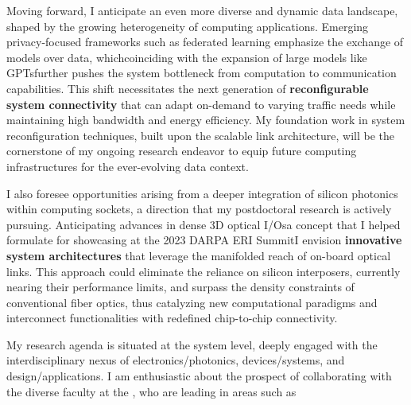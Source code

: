 Moving forward, I anticipate an even more diverse and dynamic data landscape, shaped by the growing heterogeneity of computing applications. Emerging privacy-focused frameworks such as federated learning emphasize the exchange of models over data, which\textemdash coinciding with the expansion of large models like GPTs\textemdash further pushes the system bottleneck from computation to communication capabilities. This shift necessitates the next generation of \textbf{reconfigurable system connectivity} that can adapt on-demand to varying traffic needs while maintaining high bandwidth and energy efficiency. My foundation work in system reconfiguration techniques, built upon the scalable link architecture, will be the cornerstone of my ongoing research endeavor to equip future computing infrastructures for the ever-evolving data context.

I also foresee opportunities arising from a deeper integration of silicon photonics within computing sockets, a direction that my postdoctoral research is actively pursuing. Anticipating advances in dense 3D optical I/Os\textemdash a concept that I helped formulate for showcasing at the 2023 DARPA ERI Summit\textemdash I envision \textbf{innovative system architectures} that leverage the manifolded reach of on-board optical links. This approach could eliminate the reliance on silicon interposers, currently nearing their performance limits, and surpass the density constraints of conventional fiber optics, thus catalyzing new computational paradigms and interconnect functionalities with redefined chip-to-chip connectivity.

My research agenda is situated at the system level, deeply engaged with the interdisciplinary nexus of electronics/photonics, devices/systems, and design/applications. I am enthusiastic about the prospect of collaborating with the diverse faculty at the \appSchool{}, who are leading in areas such as%